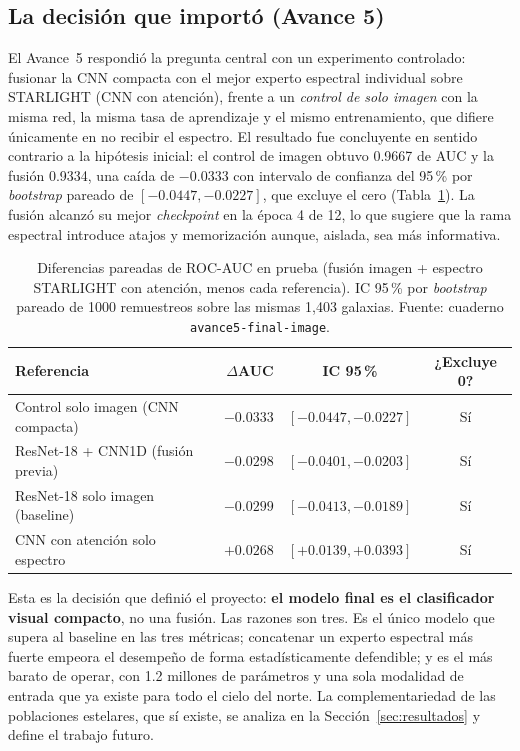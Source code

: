 \documentclass[letterpaper,11pt]{article}
\begin{document}
\subsection{La decisión que importó (Avance 5)}
El Avance~5 respondió la pregunta central con un experimento controlado: fusionar la CNN compacta con el mejor experto espectral individual sobre STARLIGHT (CNN con atención), frente a un \emph{control de solo imagen} con la misma red, la misma tasa de aprendizaje y el mismo entrenamiento, que difiere únicamente en no recibir el espectro. El resultado fue concluyente en sentido contrario a la hipótesis inicial: el control de imagen obtuvo 0.9667 de AUC y la fusión 0.9334, una caída de $-0.0333$ con intervalo de confianza del 95\,\% por \emph{bootstrap} pareado de $[-0.0447, -0.0227]$, que excluye el cero (Tabla~\ref{tab:pareado}). La fusión alcanzó su mejor \emph{checkpoint} en la época 4 de 12, lo que sugiere que la rama espectral introduce atajos y memorización aunque, aislada, sea más informativa.

\begin{table}[H]
  \centering
  \caption{Diferencias pareadas de ROC-AUC en prueba (fusión imagen + espectro STARLIGHT con atención, menos cada referencia). IC 95\,\% por \emph{bootstrap} pareado de 1000 remuestreos sobre las mismas 1,403 galaxias. Fuente: cuaderno \texttt{avance5-final-image}.}
  \label{tab:pareado}
  \begin{tabular}{lrcc}
    \toprule
    Referencia & $\Delta$AUC & IC 95\,\% & ¿Excluye 0? \\
    \midrule
    Control solo imagen (CNN compacta) & $-0.0333$ & $[-0.0447, -0.0227]$ & Sí \\
    ResNet-18 + CNN1D (fusión previa)  & $-0.0298$ & $[-0.0401, -0.0203]$ & Sí \\
    ResNet-18 solo imagen (baseline)   & $-0.0299$ & $[-0.0413, -0.0189]$ & Sí \\
    CNN con atención solo espectro     & $+0.0268$ & $[+0.0139, +0.0393]$ & Sí \\
    \bottomrule
  \end{tabular}
\end{table}

Esta es la decisión que definió el proyecto: \textbf{el modelo final es el clasificador visual compacto}, no una fusión. Las razones son tres. Es el único modelo que supera al baseline en las tres métricas; concatenar un experto espectral más fuerte empeora el desempeño de forma estadísticamente defendible; y es el más barato de operar, con 1.2 millones de parámetros y una sola modalidad de entrada que ya existe para todo el cielo del norte. La complementariedad de las poblaciones estelares, que sí existe, se analiza en la Sección~\ref{sec:resultados} y define el trabajo futuro.
\end{document}
